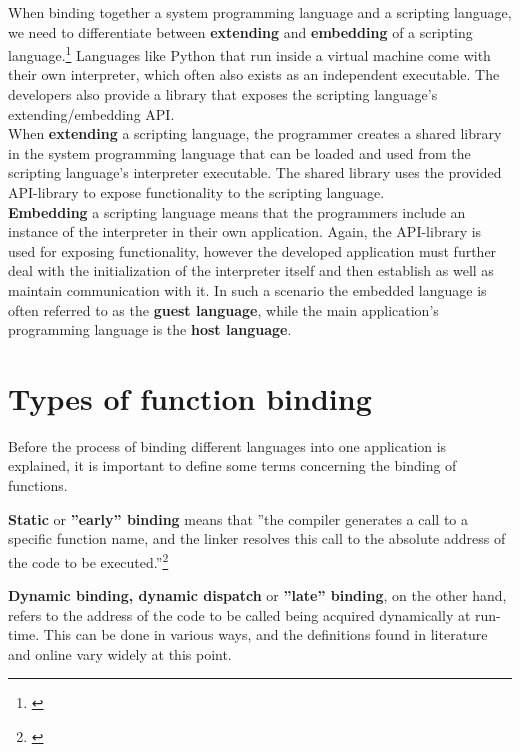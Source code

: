 When binding together a system programming language and a scripting language, we need to differentiate between \textbf{extending} and \textbf{embedding} of a scripting language.\footnote{\citep{PythonHP}} Languages like Python that run inside a virtual machine come with their own interpreter, which often also exists as an independent executable. The developers also provide a library that exposes the scripting language's extending/embedding API. \\
When \textbf{extending} a scripting language, the programmer creates a shared library in the system programming language that can be loaded and used from the scripting language's interpreter executable. The shared library uses the provided API-library to expose functionality to the scripting language.\\
\textbf{Embedding} a scripting language means that the programmers include an instance of the interpreter in their own application. Again, the API-library is used for exposing functionality, however the developed application must further deal with the initialization of the interpreter itself and then establish as well as maintain communication with it. In such a scenario the embedded language is often referred to as the \textbf{guest language}, while the main application's programming language is the \textbf{host language}.

\section{Types of function binding}
\label{sec:TypesOfFunctionBinding}

Before the process of binding different languages into one application is explained, it is important to define some terms concerning the binding of functions.

\textbf{Static} or \textbf{''early'' binding} means that ''the compiler generates a call to a specific function name, and the linker resolves this call to the absolute address of the code to be executed.''\footnote{\citep[41]{ThinkingInCPP}}

\textbf{Dynamic binding, dynamic dispatch} or \textbf{''late'' binding}, on the other hand, refers to the address of the code to be called being acquired dynamically at run-time. This can be done in various ways, and the definitions found in literature and online vary widely at this point.

